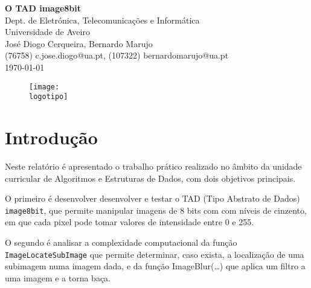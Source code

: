\documentclass{report}
\begin{document}
%
\def\titulo{O TAD image8bit}
\def\data{\today}
\def\autores{José Diogo Cerqueira, Bernardo Marujo}
\def\autorescontactos{(76758) c.jose.diogo@ua.pt, (107322) bernardomarujo@ua.pt}
\def\departamento{Dept. de Eletrónica, Telecomunicações e Informática}
\def\empresa{Universidade de Aveiro}
\def\logotipo{ua.pdf}
%
%

%
%
\begin{titlepage}

\begin{center}
%
\vspace{50mm}
%
{\Huge\textbf{\titulo}}\\
{\Large \departamento\\ \empresa}\\
%
\vspace{10mm}
%
%
{\LARGE \autores\\ \autorescontactos} \\ 
%
\vspace{10mm}
%
\data
%
\vspace{20mm}
%
\begin{figure}[h]
\center
\texttt{[image: \\logotipo]}
\end{figure}
%
\end{center}
%
\end{titlepage}


\tableofcontents



\clearpage
{}


\chapter{Introdução}

Neste relatório é apresentado o trabalho prático realizado no âmbito da unidade curricular de Algoritmos e Estruturas de Dados, com dois objetivos principais.
\par
O primeiro é desenvolver desenvolver e testar o TAD (Tipo Abstrato de Dados) \texttt{image8bit}, que permite manipular imagens de 8 bits com com níveis de cinzento, em que cada pixel pode tomar valores de intensidade entre 0 e 255.
\par
O segundo é analisar a complexidade computacional da função \texttt{ImageLocateSubImage} que permite determinar, caso exista, a localização de uma subimagem numa imagem dada, e da função ImageBlur(…) que aplica um filtro a uma imagem e a torna baça.
\end{document}

